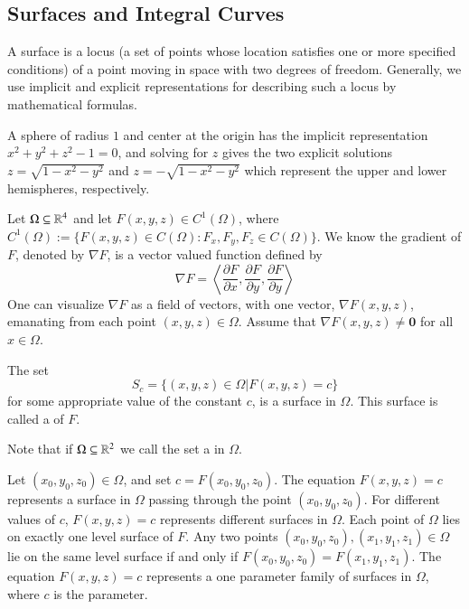 \documentclass[12pt, a4paper, oneside, openright, titlepage]{book}
\begin{document}
\begin{appendices}
    \section{Surfaces and Integral Curves}

    \begin{defn}[Surface]
        A surface is a locus (a set of points whose location satisfies one or more specified conditions) of a point moving in space with two degrees of freedom. Generally, we use implicit and explicit representations for describing such a locus by mathematical formulas.
    \end{defn}


    \begin{eg}
        A sphere of radius $1$ and center at the origin has the implicit representation $x^2+y^2+z^2-1=0$, and solving for $z$ gives the two explicit solutions $z = \sqrt{1-x^2-y^2}$ and $z = -\sqrt{1-x^2-y^2}$ which represent the upper and lower hemispheres, respectively.
    \end{eg}

    
    Let $\Omega \subseteq \mathbb R^4$ and let $F(x,y,z) \in C^1(\Omega)$, where $C^1(\Omega) := \{F(x,y,z) \in C(\Omega):F_x,F_y,F_z \in C(\Omega)\}$. We know the gradient of $F$, denoted by $\nabla F$, is a vector valued function defined by \begin{equation*}
        \nabla F = \left\langle \frac{\partial F}{\partial x}, \frac{\partial F}{\partial y},\frac{\partial F}{\partial y}\right\rangle
    \end{equation*}
    One can visualize $\nabla F$ as a field of vectors, with one vector, $\nabla F(x,y,z)$, emanating from each point $(x,y,z) \in \Omega$. Assume that $\nabla F(x,y,z) \neq \mathbf{0}$ for all $x \in \Omega$.

    \begin{defn}
        The set \begin{equation*}
            S_c = \{(x,y,z) \in \Omega\vert F(x,y,z) = c\}
        \end{equation*}
        for some appropriate value of the constant $c$, is a surface in $\Omega$. This surface is called a  of $F$.
    \end{defn}

    Note that if $\Omega \subseteq \mathbb R^2$ we call the set a  in $\Omega$.

    Let $(x_0,y_0,z_0) \in \Omega$, and set $c = F(x_0,y_0,z_0)$. The equation $F(x,y,z) = c$ represents a surface in $\Omega$ passing through the point $(x_0,y_0,z_0)$. For different values of $c$, $F(x,y,z) = c$ represents different surfaces in $\Omega$. Each point of $\Omega$ lies on exactly one level surface of $F$. Any two points $(x_0,y_0,z_0),(x_1,y_1,z_1) \in \Omega$ lie on the same level surface if and only if $F(x_0,y_0,z_0) = F(x_1,y_1,z_1)$. The equation $F(x,y,z) = c$ represents a one parameter family of surfaces in $\Omega$, where $c$ is the parameter.


\end{appendices}
\end{document}

